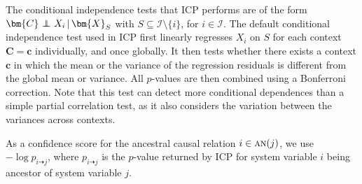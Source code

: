 \documentclass[twoside,11pt]{article}
\DeclareMathOperator*{\CI}{{\,\perp\mkern-12mu\perp\,}}
\newcommand\idcausal{\dashrightarrow}
\newcommand\B[1]{\bm{#1}}
\newcommand\C[1]{\mathcal{#1}}
\newcommand\mathbfsc[1]{\text{\normalfont\scshape#1}}
\newcommand\an[1]{\mathbfsc{an}(#1)}
\newcommand\given{\,|\,}
\newcommand\causes{\idcausal}
\newcommand{\Joris}[1]{{\color{blue}#1}}
\begin{document}
The conditional independence tests that ICP performs are of the form 
$\B{C} \CI X_i \given \B{X}_S$ with $S \subseteq \C{I} \setminus \{i\}$, for $i \in \C{I}$.
The default conditional independence test used in ICP first linearly regresses $X_i$ on $S$ for
each context $\B{C}=\B{c}$ individually, and once globally. It then tests whether there exists
a context $\B{c}$ in which the mean or the variance of the regression residuals is different from
the global mean or variance. All $p$-values are then combined using a Bonferroni correction.
Note that this test can detect more conditional dependences than a simple partial correlation test, 
as it also considers the variation between the variances across contexts. 

As a confidence score for the ancestral causal relation $i \in \an{j}$, we use $-\log p_{i\causes j}$, 
where $p_{i\causes j}$ is the $p$-value returned by ICP for system variable $i$ being ancestor of system variable $j$.


\end{document}

